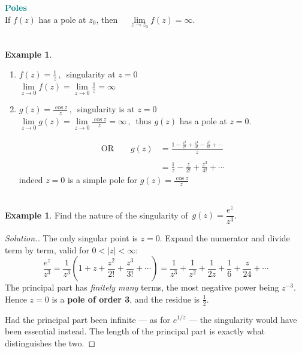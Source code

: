 \documentclass[11pt,a4paper]{article}
\theoremstyle{definition}
\newtheorem{example}[thm]{Example}
\newenvironment{solution}
  {\renewcommand{\qedsymbol}{}\begin{proof}[\textit{Solution}.]}
  {\end{proof}}
\begin{document}
\textbf{\textcolor{teal}{Poles}}\\
If $f(z)$ has a pole at $z_0$, then $\quad \lim\limits_{z\rightarrow z_0}f(z) = \infty$.\\\\



\begin{example}
\begin{enumerate}
\item $f(z) = \frac{1}{z}\,,\,$ singularity at $z = 0$\\

$\lim\limits_{z\rightarrow 0} f(z) = \lim\limits_{z\rightarrow 0}\frac{1}{z} = \infty$\\


\item $g(z) = \frac{\cos z}{z}\,,\,$ singularity is at $z = 0$\\

$\displaystyle{\lim\limits_{z \rightarrow 0} g(z) = \lim\limits_{z \rightarrow 0}\frac{\cos z}{z} = \infty}\,,\,$ thus $g(z)$ has a pole at $z  = 0$.

\begin{align*}
\text{OR}\qquad  g(z) & = \frac{1 - \frac{z^2}{2!} + \frac{z^4}{4!} - \frac{z^6}{6!} + \cdots}{z}\\\\
& = \frac{1}{z} - \frac{z}{2!} + \frac{z^3}{4!}+ \cdots
\end{align*}
indeed $z = 0$ is a simple pole for $g(z) = \frac{\cos z}{z}$\\\\
\end{enumerate}






\begin{example}
Find the nature of the singularity of $\, g(z) = \dfrac{e^z}{z^3}$.
\end{example}
\begin{solution}
The only singular point is $z=0$. Expand the numerator and divide term by term,
valid for $0<\left|z\right|<\infty$:
$$\frac{e^z}{z^3}=\frac{1}{z^3}\left(1+z+\frac{z^2}{2!}+\frac{z^3}{3!}+\cdots\right)
=\frac{1}{z^3}+\frac{1}{z^2}+\frac{1}{2z}+\frac{1}{6}+\frac{z}{24}+\cdots$$
The principal part has \emph{finitely many} terms, the most negative power
being $z^{-3}$. Hence $z=0$ is a \textbf{pole of order 3}, and the residue is
$\frac{1}{2}$.

Had the principal part been infinite --- as for $e^{1/z}$ --- the singularity
would have been essential instead. The length of the principal part is exactly
what distinguishes the two.
\end{solution}
\end{example}
\end{document}
